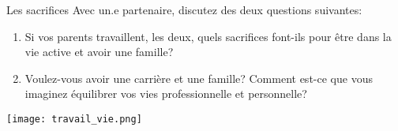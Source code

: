 \begin{frame}{Les sacrifices}
  Avec un.e partenaire, discutez des deux questions suivantes:
  \begin{enumerate}
    \item Si vos parents travaillent, les deux, quels sacrifices font-ils pour être dans la vie active et avoir une famille?
    \item Voulez-vous avoir une carrière et une famille? Comment est-ce que vous imaginez équilibrer vos vies professionnelle et personnelle?
  \end{enumerate}
  \begin{center}
    \texttt{[image: travail\_vie.png]}
  \end{center}
\end{frame}